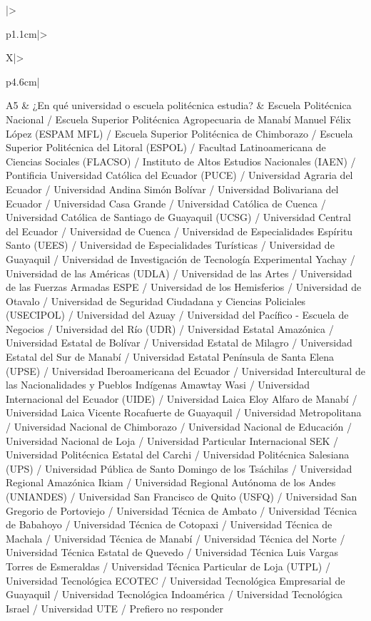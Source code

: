 {\begin{xltabular}{\textwidth}{|>{\raggedright\arraybackslash}p{1.1cm}|>{\raggedright\arraybackslash}X|>{\raggedright\arraybackslash}p{4.6cm}|}
  A5 & ¿En qué universidad o escuela politécnica estudia? & Escuela Politécnica Nacional / Escuela Superior Politécnica Agropecuaria de Manabí Manuel Félix López (ESPAM MFL) / Escuela Superior Politécnica de Chimborazo / Escuela Superior Politécnica del Litoral (ESPOL) / Facultad Latinoamericana de Ciencias Sociales (FLACSO) / Instituto de Altos Estudios Nacionales (IAEN) / Pontificia Universidad Católica del Ecuador (PUCE) / Universidad Agraria del Ecuador / Universidad Andina Simón Bolívar / Universidad Bolivariana del Ecuador / Universidad Casa Grande / Universidad Católica de Cuenca / Universidad Católica de Santiago de Guayaquil (UCSG) / Universidad Central del Ecuador / Universidad de Cuenca / Universidad de Especialidades Espíritu Santo (UEES) / Universidad de Especialidades Turísticas / Universidad de Guayaquil / Universidad de Investigación de Tecnología Experimental Yachay / Universidad de las Américas (UDLA) / Universidad de las Artes / Universidad de las Fuerzas Armadas ESPE / Universidad de los Hemisferios / Universidad de Otavalo / Universidad de Seguridad Ciudadana y Ciencias Policiales (USECIPOL) / Universidad del Azuay / Universidad del Pacífico - Escuela de Negocios / Universidad del Río (UDR) / Universidad Estatal Amazónica / Universidad Estatal de Bolívar / Universidad Estatal de Milagro / Universidad Estatal del Sur de Manabí / Universidad Estatal Península de Santa Elena (UPSE) / Universidad Iberoamericana del Ecuador / Universidad Intercultural de las Nacionalidades y Pueblos Indígenas Amawtay Wasi / Universidad Internacional del Ecuador (UIDE) / Universidad Laica Eloy Alfaro de Manabí / Universidad Laica Vicente Rocafuerte de Guayaquil / Universidad Metropolitana / Universidad Nacional de Chimborazo / Universidad Nacional de Educación / Universidad Nacional de Loja / Universidad Particular Internacional SEK / Universidad Politécnica Estatal del Carchi / Universidad Politécnica Salesiana (UPS) / Universidad Pública de Santo Domingo de los Tsáchilas / Universidad Regional Amazónica Ikiam / Universidad Regional Autónoma de los Andes (UNIANDES) / Universidad San Francisco de Quito (USFQ) / Universidad San Gregorio de Portoviejo / Universidad Técnica de Ambato / Universidad Técnica de Babahoyo / Universidad Técnica de Cotopaxi / Universidad Técnica de Machala / Universidad Técnica de Manabí / Universidad Técnica del Norte / Universidad Técnica Estatal de Quevedo / Universidad Técnica Luis Vargas Torres de Esmeraldas / Universidad Técnica Particular de Loja (UTPL) / Universidad Tecnológica ECOTEC / Universidad Tecnológica Empresarial de Guayaquil / Universidad Tecnológica Indoamérica / Universidad Tecnológica Israel / Universidad UTE / Prefiero no responder \\ \hline

\end{xltabular}}
